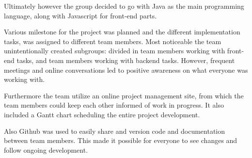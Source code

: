 Ultimately however the group decided to go with Java as the main programming language, along with Javascript for front-end parts.

Various milestone for the project was planned and the different implementation tasks, was assigned to different team members. Most noticeable the team unintentionally created subgroups: divided in team members working with front-end tasks, and team members working with backend tasks.
However, frequent meetings and online conversations led to positive awareness on what everyone was working with.

Furthermore the team utilize an online project management site, from which the team members could keep each other informed of work in progress. It also included a Gantt chart scheduling the entire project development.

Also Github was used to easily share and version code and documentation between team members. This made it possible for everyone to see changes and follow ongoing development.


